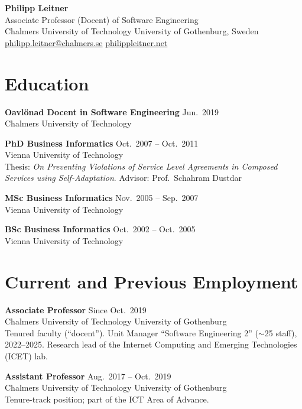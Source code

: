 \documentclass[a4paper,11pt]{article}
\begin{document}
\begin{center}
{\LARGE\bfseries Philipp Leitner}\\[0.3em]
{\normalsize Associate Professor (Docent) of Software Engineering\\
Chalmers University of Technology \textbar{} University of Gothenburg, Sweden\\
\href{mailto:philipp.leitner@chalmers.se}{philipp.leitner@chalmers.se} \textbar{} \href{http://philippleitner.net}{philippleitner.net}}
\end{center}

\section{Education}

\noindent\textbf{Oavlönad Docent in Software Engineering} \hfill Jun.\ 2019\\
Chalmers University of Technology\medskip

\noindent\textbf{PhD Business Informatics} \hfill Oct.\ 2007 -- Oct.\ 2011\\
Vienna University of Technology\\
{\small Thesis: \emph{On Preventing Violations of Service Level Agreements in Composed Services using Self-Adaptation}. Advisor: Prof.\ Schahram Dustdar}\medskip

\noindent\textbf{MSc Business Informatics} \hfill Nov.\ 2005 -- Sep.\ 2007\\
Vienna University of Technology\medskip

\noindent\textbf{BSc Business Informatics} \hfill Oct.\ 2002 -- Oct.\ 2005\\
Vienna University of Technology

\section{Current and Previous Employment}

\noindent\textbf{Associate Professor} \hfill Since Oct.\ 2019\\
Chalmers University of Technology \textbar{} University of Gothenburg\\
{\small Tenured faculty (``docent''). Unit Manager ``Software Engineering 2'' ($\sim$25 staff), 2022--2025. Research lead of the Internet Computing and Emerging Technologies (ICET) lab.}\medskip

\noindent\textbf{Assistant Professor} \hfill Aug.\ 2017 -- Oct.\ 2019\\
Chalmers University of Technology \textbar{} University of Gothenburg\\
{\small Tenure-track position; part of the ICT Area of Advance.}\medskip
\end{document}
